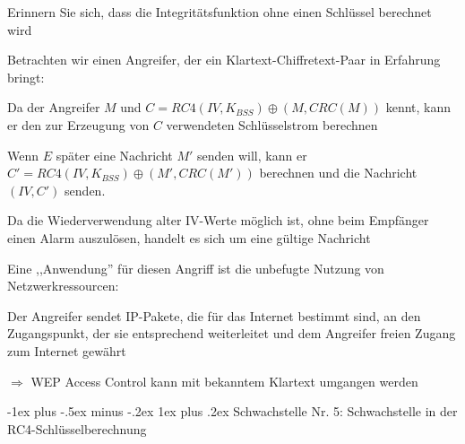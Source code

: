 \documentclass[a4paper]{article}
\makeatletter
\renewcommand{\subsubsection}{\@startsection{subsubsection}{3}{0mm}%
 {-1ex plus -.5ex minus -.2ex}%
 {1ex plus .2ex}%
 {\normalfont\small\bfseries}}
\makeatother
\begin{document}
\begin{multicols}{3}
      \begin{itemize*}
            \item Erinnern Sie sich, dass die Integritätsfunktion ohne einen Schlüssel
            berechnet wird
            \item Betrachten wir einen Angreifer, der ein Klartext-Chiffretext-Paar in
            Erfahrung bringt:
            \begin{itemize*}
                  \item Da der Angreifer $M$ und $C=RC4(IV, K_{BSS})\oplus (M, CRC(M))$ kennt, kann er den zur Erzeugung von $C$ verwendeten Schlüsselstrom berechnen
                  \item Wenn $E$ später eine Nachricht $M'$ senden will, kann er $C' = RC4(IV, K_{BSS})\oplus (M', CRC(M'))$ berechnen und die Nachricht $(IV, C')$ senden.
                  \item Da die Wiederverwendung alter IV-Werte möglich ist, ohne beim Empfänger einen Alarm auszulösen, handelt es sich um eine gültige Nachricht
                  \item Eine ,,Anwendung'' für diesen Angriff ist die unbefugte Nutzung von Netzwerkressourcen:
                  \begin{itemize*} \item Der Angreifer sendet IP-Pakete, die für das Internet bestimmt sind, an den Zugangspunkt, der sie entsprechend weiterleitet und dem Angreifer freien Zugang zum Internet gewährt \end{itemize*}
            \end{itemize*}
            \item $\Rightarrow$ WEP Access Control kann mit bekanntem
            Klartext umgangen werden
      \end{itemize*}


      \subsubsection{Schwachstelle Nr. 5: Schwachstelle in der
            RC4-Schlüsselberechnung}


\end{multicols}
\end{document}
